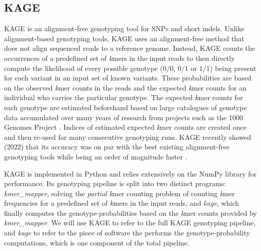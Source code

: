 \subsection{KAGE} \label{background:kage}
KAGE \cite{kage} is an alignment-free genotyping tool for SNPs and short indels.
Unlike alignment-based genotyping tools, KAGE uses an alignment-free method that does not align sequenced reads to a reference genome.
Instead, KAGE counts the occurrences of a predefined set of \textit{k}mers in the input reads to then directly compute the likelihood of every possible genotype ($0/0$, $0/1$ or $1/1$) being present for each variant in an input set of known variants.
These probabilities are based on the observed \textit{k}mer counts in the reads and the expected \textit{k}mer counts for an individual who carries the particular genotype.
The expected \textit{k}mer counts for each genotype are estimated beforehand based on large catalogues of genotype data accumulated over many years of research from projects such as the 1000 Genomes Project \cite{1000_genomes_project}.
Indices of estimated expected \textit{k}mer counts are created once and then re-used for many consecutive genotyping runs.
KAGE recently showed (2022) that its accuracy was on par with the best existing alignment-free genotyping tools while being an order of magnitude faster \cite{kage}.

KAGE is implemented in Python and relies extensively on the NumPy library for performance.
Its genotyping pipeline is split into two distinct programs: \textit{kmer\_mapper}, solving the \textit{partial} \textit{k}mer counting problem of counting \textit{k}mer frequencies for a predefined set of \textit{k}mers in the input reads, and \textit{kage}, which finally computes the genotype-probabilities based on the \textit{k}mer counts provided by \textit{kmer\_mapper}.
We will use KAGE to refer to the full KAGE genotyping pipeline, and \textit{kage} to refer to the piece of software the performs the genotype-probability computations, which is one component of the total pipeline.

